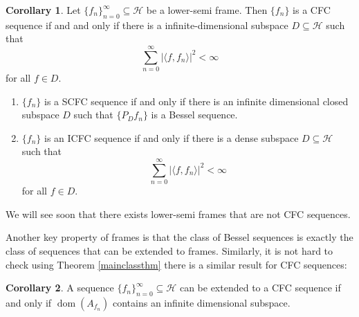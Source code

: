 \documentclass[11pt]{amsart}
\theoremstyle{definition}
\newtheorem{cor}{Corollary}[section]
\numberwithin{equation}{section}
\newcommand{\Hcal}{\mathcal{H}} %
\begin{document}
\begin{cor}
 Let $\{f_n\}_{n=0}^{\infty}\subseteq \Hcal$ be a lower-semi frame. Then $\{f_n\}$ is a CFC sequence if and and only if there is a infinite-dimensional subspace $D\subseteq \Hcal$ such that $$\sum_{n=0}^{\infty}|\langle f, f_n\rangle|^{2}<\infty$$ for all $f\in D.$
 
 \begin{enumerate}
 \item $\{f_n\}$ is a SCFC sequence if and only if there is an infinite dimensional closed subspace $D$ such that $\{P_{D}f_n\}$ is a Bessel sequence.
     \item $\{f_n\}$ is an ICFC sequence if and only if there is a dense subspace $D\subseteq \Hcal$ such that $$\sum_{n=0}^{\infty}|\langle f, f_n\rangle|^{2}<\infty$$ for all $f\in D.$
 \end{enumerate}  
\end{cor}
We will see soon that there exists lower-semi frames that are not CFC sequences.

Another key property of frames is that the class of Bessel sequences is exactly the class of sequences that can be extended to frames. Similarly, it is not hard to check using Theorem \ref{mainclassthm} there is a similar result for CFC sequences:

\begin{cor}\label{extcor}
A sequence $\{f_n\}_{n=0}^{\infty}\subseteq \Hcal$ can be extended to a CFC sequence if and only if $\operatorname{dom}(A_{f_n})$ contains an infinite dimensional subspace.
\end{cor}
\end{document}
